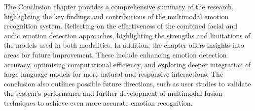 The Conclusion chapter provides a comprehensive summary of the research, highlighting the key findings and contributions of the multimodal emotion recognition system. Reflecting on the effectiveness of the combined facial and audio emotion detection approaches, highlighting the strengths and limitations of the models used in both modalities. In addition, the chapter offers insights into areas for future improvement. These include enhancing emotion detection accuracy, optimising computational efficiency, and exploring deeper integration of large language models for more natural and responsive interactions. The conclusion also outlines possible future directions, such as user studies to validate the system's performance and further development of multimodal fusion techniques to achieve even more accurate emotion recognition.